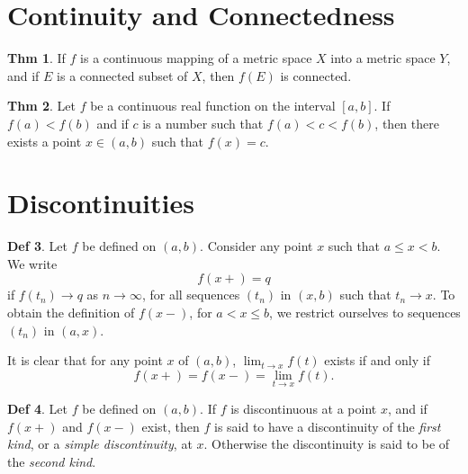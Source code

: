 \documentclass{article}
\theoremstyle{definition}
\newtheorem{definition}{Def}
\newtheorem{theorem}[definition]{Thm}
\begin{document}
\section{Continuity and Connectedness}
\begin{theorem}
    If $f$ is a continuous mapping of a metric space $X$ into a metric space $Y$, and if $E$ is a connected subset of $X$, then $f(E)$ is connected.
\end{theorem}
\begin{theorem}
    Let $f$ be a continuous real function on the interval $[a,b]$. If $f(a)<f(b)$ and if $c$ is a number such that $f(a)<c<f(b)$, then there exists a point $x\in (a,b)$ such that $f(x)=c$.
\end{theorem}

\section{Discontinuities}
\begin{definition}
    Let $f$ be defined on $(a,b)$. Consider any point $x$ such that $a\leq x<b$. We write
    \[
    f(x+)=q
    \]
    if $f(t_n)\to q$ as $n\to\infty$, for all sequences $(t_n)$ in $(x, b)$ such that $t_n\to x$. To obtain the definition of $f(x-)$, for $a<x\leq b$, we restrict ourselves to sequences $(t_n)$ in $(a,x)$.\par
    It is clear that for any point $x$ of $(a,b)$, $\lim_{t\to x}f(t)$ exists if and only if
    \[
    f(x+)=f(x-)=\lim_{t\to x}f(t).
    \]
\end{definition}
\begin{definition}
    Let $f$ be defined on $(a,b)$. If $f$ is discontinuous at a point $x$, and if $f(x+)$ and $f(x-)$ exist, then $f$ is said to have a discontinuity of the \textit{first kind}, or a \textit{simple discontinuity}, at $x$. Otherwise the discontinuity is said to be of the \textit{second kind}.
\end{definition}
\end{document}
